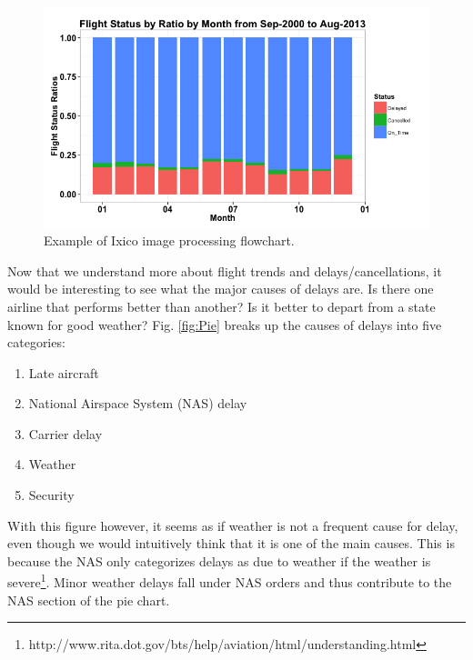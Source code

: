 \documentclass[11pt,twoside,titlepage]{article}
\begin{document}
\begin{figure}[h!]
        \centering
                \includegraphics[width=16cm]{Bar2.png}
        \caption{Example of Ixico image processing flowchart.}\label{fig:Flights by Month Percentage}
\end{figure}

\break

Now that we understand more about flight trends and delays/cancellations, it would be interesting to see what the major causes of delays are. Is there one airline that performs better than another? Is it better to depart from a state known for good weather? Fig. \ref{fig:Pie} breaks up the causes of delays into five categories:

\begin{enumerate}\itemsep1pt \parskip0pt 
  \item Late aircraft
  \item National Airspace System (NAS) delay
  \item Carrier delay
  \item Weather
  \item Security
\end{enumerate}

With this figure however, it seems as if weather is not a frequent cause for delay, even though we would intuitively think that it is one of the main causes. This is because the NAS only categorizes delays as due to weather if the weather is severe\footnote{http://www.rita.dot.gov/bts/help/aviation/html/understanding.html}. Minor weather delays fall under NAS orders and thus contribute to the NAS section of the pie chart.
\end{document}
